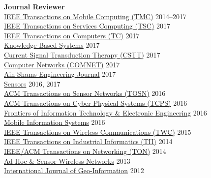 {\bf Journal Reviewer}\\
{\href{https://www.computer.org/portal/web/tmc}{IEEE Transactions on Mobile Computing (TMC)}} \hfill 2014--2017\\
{\href{https://www.computer.org/web/tsc}{IEEE Transactions on Services Computing (TSC)}} \hfill 2017\\
{\href{https://www.computer.org/web/tc}{IEEE Transactions on Computers (TC)}} \hfill 2017\\
{\href{https://www.journals.elsevier.com/knowledge-based-systems}{Knowledge-Based Systems}} \hfill 2017\\
{\href{http://benthamscience.com/journals/current-signal-transduction-therapy/}{Current Signal Transduction Therapy (CSTT)}} \hfill 2017\\
{\href{http://ees.elsevier.com/comnet/}{Computer Networks (COMNET)}} \hfill 2017\\
{\href{https://www.journals.elsevier.com/ain-shams-engineering-journal}{Ain Shams Engineering Journal}} \hfill 2017\\
{\href{http://www.mdpi.com/journal/sensors}{Sensors}} \hfill 2016, 2017\\
{\href{http://tosn.acm.org/}{ACM Transactions on Sensor Networks (TOSN)}} \hfill 2016\\
{\href{http://tcps.acm.org/}{ACM Transactions on Cyber-Physical Systems (TCPS)}} \hfill 2016\\
{\href{http://www.springer.com/computer/journal/11714}{Frontiers of Information Technology \& Electronic Engineering}} \hfill 2016\\
{\href{https://www.hindawi.com/journals/misy/}{Mobile Information Systems}} \hfill 2016\\
{\href{http://www.comsoc.org/twc}{IEEE Transactions on Wireless Communications (TWC)}} \hfill 2015\\
{\href{http://www.ieee-ies.org/pubs/transactions-on-industrial-informatics}{IEEE Transactions on Industrial Informatics (TII)}} \hfill 2014\\
{\href{http://www.ifp.illinois.edu/ton}{IEEE/ACM Transactions on Networking (TON)}} \hfill 2014\\
{\href{http://www.oldcitypublishing.com/AHSWN/AHSWN.html}{Ad Hoc \& Sensor Wireless Networks}} \hfill 2013\\
{\href{http://www.mdpi.com/journal/ijgi}{International Journal of Geo-Information}} \hfill 2012\\
